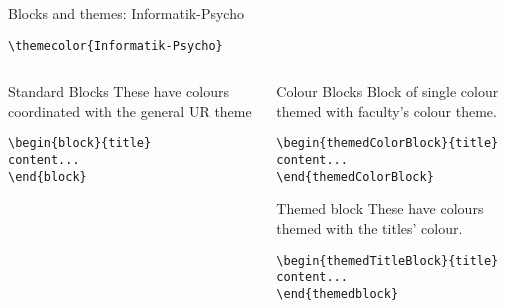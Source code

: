 \begingroup
{}
\begin{frame}[fragile]{Blocks and themes: Informatik-Psycho}
    \begin{center}\verb|\themecolor{Informatik-Psycho}|\end{center}
\begin{columns} %
\begin{column}{0.3\textwidth}
\begin{block}{Standard Blocks}
These have colours coordinated with the general UR theme
\begin{verbatim}
\begin{block}{title}
content...
\end{block}
\end{verbatim}
\end{block}
\end{column}
\begin{column}{0.7\textwidth}
\begin{themedColorBlock}{Colour Blocks}
Block of single colour themed with faculty's colour theme.
\small
\begin{verbatim}
\begin{themedColorBlock}{title}
content...
\end{themedColorBlock}
\end{verbatim}
\end{themedColorBlock}
\begin{themedTitleBlock} {Themed block}
These have colours themed with the titles' colour.
\small
\begin{verbatim}
\begin{themedTitleBlock}{title}
content...
\end{themedblock}
\end{verbatim}
\end{themedTitleBlock}
\end{column}
\end{columns}
\end{frame}
\endgroup


